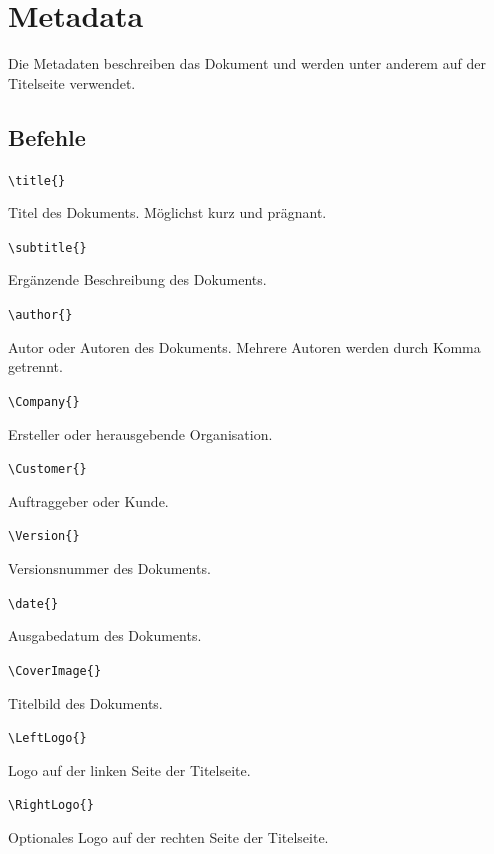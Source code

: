 \chapter{Metadata}

Die Metadaten beschreiben das Dokument und werden unter anderem auf der Titelseite verwendet.

\section{Befehle}

\texttt{\textbackslash title\{\}}

Titel des Dokuments. Möglichst kurz und prägnant.

\texttt{\textbackslash subtitle\{\}}

Ergänzende Beschreibung des Dokuments.

\texttt{\textbackslash author\{\}}

Autor oder Autoren des Dokuments. Mehrere Autoren werden durch Komma getrennt.

\texttt{\textbackslash Company\{\}}

Ersteller oder herausgebende Organisation.

\texttt{\textbackslash Customer\{\}}

Auftraggeber oder Kunde.

\texttt{\textbackslash Version\{\}}

Versionsnummer des Dokuments.

\texttt{\textbackslash date\{\}}

Ausgabedatum des Dokuments.

\texttt{\textbackslash CoverImage\{\}}

Titelbild des Dokuments.

\texttt{\textbackslash LeftLogo\{\}}

Logo auf der linken Seite der Titelseite.

\texttt{\textbackslash RightLogo\{\}}

Optionales Logo auf der rechten Seite der Titelseite.
